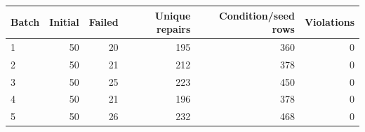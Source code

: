 \begin{tabular}{@{}lrrrrr@{}}
\toprule
Batch & Initial & Failed & Unique repairs & Condition/seed rows & Violations \\
\midrule
1 & 50 & 20 & 195 & 360 & 0 \\
2 & 50 & 21 & 212 & 378 & 0 \\
3 & 50 & 25 & 223 & 450 & 0 \\
4 & 50 & 21 & 196 & 378 & 0 \\
5 & 50 & 26 & 232 & 468 & 0 \\
\bottomrule
\end{tabular}
